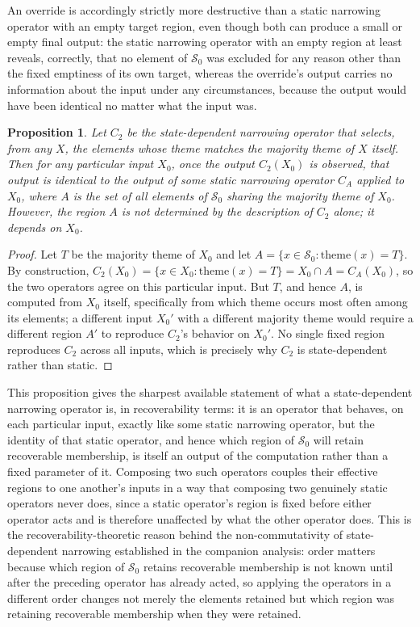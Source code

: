 \documentclass[11pt]{article}
\newtheorem{proposition}{Proposition}
\begin{document}
An override is accordingly strictly more destructive than a static narrowing operator with an empty target region, even though both can produce a small or empty final output: the static narrowing operator with an empty region at least reveals, correctly, that no element of $\mathcal{S}_0$ was excluded for any reason other than the fixed emptiness of its own target, whereas the override's output carries no information about the input under any circumstances, because the output would have been identical no matter what the input was.

\begin{proposition}
Let $C_2$ be the state-dependent narrowing operator that selects, from any $X$, the elements whose theme matches the majority theme of $X$ itself. Then for any particular input $X_0$, once the output $C_2(X_0)$ is observed, that output is identical to the output of some static narrowing operator $C_{A}$ applied to $X_0$, where $A$ is the set of all elements of $\mathcal{S}_0$ sharing the majority theme of $X_0$. However, the region $A$ is not determined by the description of $C_2$ alone; it depends on $X_0$.
\end{proposition}

\begin{proof}
Let $T$ be the majority theme of $X_0$ and let $A = \{x \in \mathcal{S}_0 : \mathrm{theme}(x) = T\}$. By construction, $C_2(X_0) = \{x \in X_0 : \mathrm{theme}(x) = T\} = X_0 \cap A = C_A(X_0)$, so the two operators agree on this particular input. But $T$, and hence $A$, is computed from $X_0$ itself, specifically from which theme occurs most often among its elements; a different input $X_0'$ with a different majority theme would require a different region $A'$ to reproduce $C_2$'s behavior on $X_0'$. No single fixed region reproduces $C_2$ across all inputs, which is precisely why $C_2$ is state-dependent rather than static.
\end{proof}

This proposition gives the sharpest available statement of what a state-dependent narrowing operator is, in recoverability terms: it is an operator that behaves, on each particular input, exactly like some static narrowing operator, but the identity of that static operator, and hence which region of $\mathcal{S}_0$ will retain recoverable membership, is itself an output of the computation rather than a fixed parameter of it. Composing two such operators couples their effective regions to one another's inputs in a way that composing two genuinely static operators never does, since a static operator's region is fixed before either operator acts and is therefore unaffected by what the other operator does. This is the recoverability-theoretic reason behind the non-commutativity of state-dependent narrowing established in the companion analysis: order matters because which region of $\mathcal{S}_0$ retains recoverable membership is not known until after the preceding operator has already acted, so applying the operators in a different order changes not merely the elements retained but which region was retaining recoverable membership when they were retained.
\end{document}
